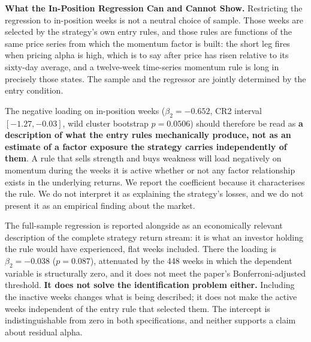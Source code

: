 \documentclass[11pt]{article}
\begin{document}
\textbf{What the In-Position Regression Can and Cannot Show.} Restricting the regression to in-position weeks is not a neutral choice of sample. Those weeks are selected by the strategy's own entry rules, and those rules are functions of the same price series from which the momentum factor is built: the short leg fires when pricing alpha is high, which is to say after price has risen relative to its sixty-day average, and a twelve-week time-series momentum rule is long in precisely those states. The sample and the regressor are jointly determined by the entry condition.

The negative loading on in-position weeks ($\beta_2 = -0.652$, CR2 interval $[-1.27, -0.03]$, wild cluster bootstrap $p = 0.0506$) should therefore be read as \textbf{a description of what the entry rules mechanically produce, not as an estimate of a factor exposure the strategy carries independently of them}. A rule that sells strength and buys weakness will load negatively on momentum during the weeks it is active whether or not any factor relationship exists in the underlying returns. We report the coefficient because it characterises the rule. We do not interpret it as explaining the strategy's losses, and we do not present it as an empirical finding about the market.

The full-sample regression is reported alongside as an economically relevant description of the complete strategy return stream: it is what an investor holding the rule would have experienced, flat weeks included. There the loading is $\beta_2 = -0.038$ ($p = 0.087$), attenuated by the 448 weeks in which the dependent variable is structurally zero, and it does not meet the paper's Bonferroni-adjusted threshold. \textbf{It does not solve the identification problem either.} Including the inactive weeks changes what is being described; it does not make the active weeks independent of the entry rule that selected them. The intercept is indistinguishable from zero in both specifications, and neither supports a claim about residual alpha.
\end{document}
